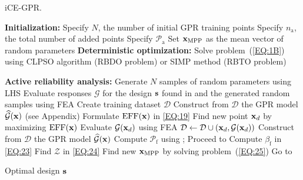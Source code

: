 \documentclass[preprint,3p]{elsarticle}
\begin{document}
\begin{linenumbers}
\begin{algorithm}[t!]
	\caption{iCE-GPR.}\label{Algo2}
	\begin{algorithmic}[1]
		\State \textbf{Initialization:} 
		\State Specify $N$, the number of initial GPR training points
		\State Specify $n_\text{a}$, the total number of added points
		\State Specify $\mathcal{P}_\text{a}$
		\State Set ${\bf x}_\text{MPP}$ as the mean vector of random parameters
		\State \textbf{Deterministic optimization:} 
		\State Solve problem~(\ref{EQ:1B}) using CLPSO algorithm (RBDO problem) or SIMP method (RBTO problem) \label{Algo2-7}
		
		\State \textbf{Active reliability analysis:}
		\State Generate $N$ samples of random parameters using LHS
		\State Evaluate responses $\mathcal{G}$ for the design ${\bf s}$ found in  and the generated random samples using FEA  
		\State Create training dataset $\mathcal{D}$
		\State Construct from $\mathcal{D}$ the GPR model $\widehat{\mathcal{G}}({\bf x})$ (see Appendix)
		\State Formulate $\text{EFF}({\bf x})$ in \cref{EQ:19}
		\State Find new point ${\bf x}_d$ by maximizing $\text{EFF}({\bf x})$
		\State Evaluate $\mathcal{G}({\bf x}_d)$ using FEA
		\State $\mathcal{D} \gets \mathcal{D} \cup ({\bf x}_d,\mathcal{G}({\bf x}_d))$
		\EndFor
		\State Construct from $\mathcal{D}$ the GPR model $\widehat{\mathcal{G}}({\bf x})$
		\State Compute $\mathcal{P}_\text{f}$ using ;
		\State Proceed to 
		\Else
		\State Compute $\beta_\text{f}$ in \cref{EQ:23}
		\State Find $\mathcal{Z}$ in \cref{EQ:24}
		\State Find new ${\bf x}_\text{MPP}$ by solving problem~(\ref{EQ:25})
		\State Go to  
		\EndIf
		
		\State \Return Optimal design ${\bf s}$ \label{Algo2-29}	\end{algorithmic}
\end{algorithm}


\end{linenumbers}
\end{document}
